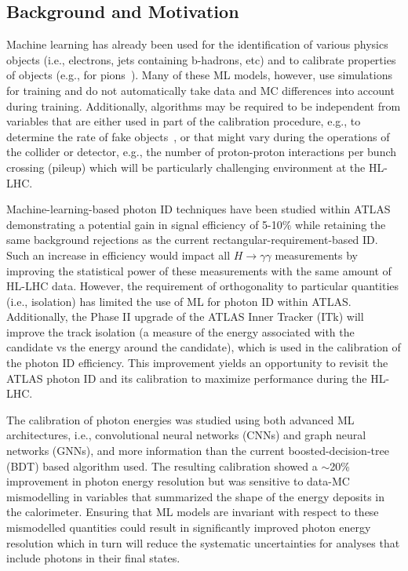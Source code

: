 \documentclass[letter, USenglish, 11pt, subfigure]{article}
\begin{document}
\subsection{Background and Motivation}

Machine learning has already been used for the identification of various physics objects (i.e., electrons, jets containing b-hadrons, etc) and to calibrate properties of objects (e.g., for pions~\cite{ATL-PHYS-PUB-2020-018}). Many of these ML models, however, use simulations for training and do not automatically take data and MC differences into account during training. Additionally, algorithms may be required to be independent from variables that are either used in part of the calibration procedure, e.g., to determine the rate of fake objects~\cite{atlas_photon_id}, or that might vary during the operations of the collider or detector, e.g., the number of proton-proton interactions per bunch crossing (pileup) which will be particularly challenging environment at the HL-LHC.

Machine-learning-based photon ID techniques have been studied within ATLAS demonstrating a potential gain in signal efficiency of 5-10\% while retaining the same background rejections as the current rectangular-requirement-based ID. Such an increase in efficiency would impact all $H\to\gamma\gamma$ measurements by improving the statistical power of these measurements with the same amount of HL-LHC data. However, the requirement of orthogonality to particular quantities (i.e., isolation) has limited the use of ML for photon ID within ATLAS. Additionally, the Phase II upgrade of the ATLAS Inner Tracker (ITk) will improve the track isolation (a measure of the energy associated with the candidate vs the energy around the candidate), which is used in the calibration of the photon ID efficiency. This improvement yields an opportunity to revisit the ATLAS photon ID and its calibration to maximize performance during the HL-LHC.

The calibration of photon energies was studied using both advanced ML architectures, i.e., convolutional neural networks (CNNs) and graph neural networks (GNNs), and more information than the current boosted-decision-tree (BDT) based algorithm used. The resulting calibration showed a $\sim$20\% improvement in photon energy resolution but was sensitive to data-MC mismodelling in variables that summarized the shape of the energy deposits in the calorimeter. Ensuring that ML models are invariant with respect to these mismodelled quantities could result in significantly improved photon energy resolution which in turn will reduce the systematic uncertainties for analyses that include photons in their final states.
\end{document}
